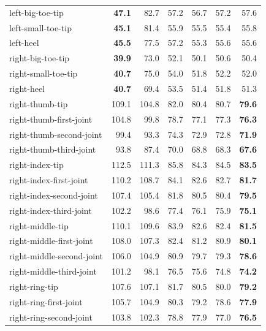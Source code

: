 \begin{longtable}{lrrrrrr}
left-big-toe-tip & \textbf{47.1} & 82.7 & 57.2 & 56.7 & 57.2 & 57.6 \\ %
left-small-toe-tip & \textbf{45.1} & 81.4 & 55.9 & 55.5 & 55.4 & 55.8 \\ %
left-heel & \textbf{45.5} & 77.5 & 57.2 & 55.3 & 55.6 & 55.6 \\ %
right-big-toe-tip & \textbf{39.9} & 73.0 & 52.1 & 50.1 & 50.6 & 50.4 \\ %
right-small-toe-tip & \textbf{40.7} & 75.0 & 54.0 & 51.8 & 52.2 & 52.0 \\ %
right-heel & \textbf{40.7} & 69.4 & 53.5 & 51.4 & 51.8 & 51.3 \\ %
right-thumb-tip & 109.1 & 104.8 & 82.0 & 80.4 & 80.7 & \textbf{79.6} \\ %
right-thumb-first-joint & 104.8 & 99.8 & 78.7 & 77.1 & 77.3 & \textbf{76.3} \\ %
right-thumb-second-joint & 99.4 & 93.3 & 74.3 & 72.9 & 72.8 & \textbf{71.9} \\ %
right-thumb-third-joint & 93.8 & 87.4 & 70.0 & 68.8 & 68.3 & \textbf{67.6} \\ %
right-index-tip & 112.5 & 111.3 & 85.8 & 84.3 & 84.5 & \textbf{83.5} \\ %
right-index-first-joint & 110.2 & 108.7 & 84.1 & 82.6 & 82.7 & \textbf{81.7} \\ %
right-index-second-joint & 107.4 & 105.4 & 81.8 & 80.5 & 80.4 & \textbf{79.5} \\ %
right-index-third-joint & 102.2 & 98.6 & 77.4 & 76.1 & 75.9 & \textbf{75.1} \\ %
right-middle-tip & 110.1 & 109.6 & 83.9 & 82.6 & 82.4 & \textbf{81.5} \\ %
right-middle-first-joint & 108.0 & 107.3 & 82.4 & 81.2 & 80.9 & \textbf{80.1} \\ %
right-middle-second-joint & 106.0 & 104.9 & 80.9 & 79.7 & 79.3 & \textbf{78.6} \\ %
right-middle-third-joint & 101.2 & 98.1 & 76.5 & 75.6 & 74.8 & \textbf{74.2} \\ %
right-ring-tip & 107.6 & 107.1 & 81.7 & 80.5 & 80.0 & \textbf{79.2} \\ %
right-ring-first-joint & 105.7 & 104.9 & 80.3 & 79.2 & 78.6 & \textbf{77.9} \\ %
right-ring-second-joint & 103.8 & 102.3 & 78.8 & 77.9 & 77.0 & \textbf{76.5} \\ %

\end{longtable}
